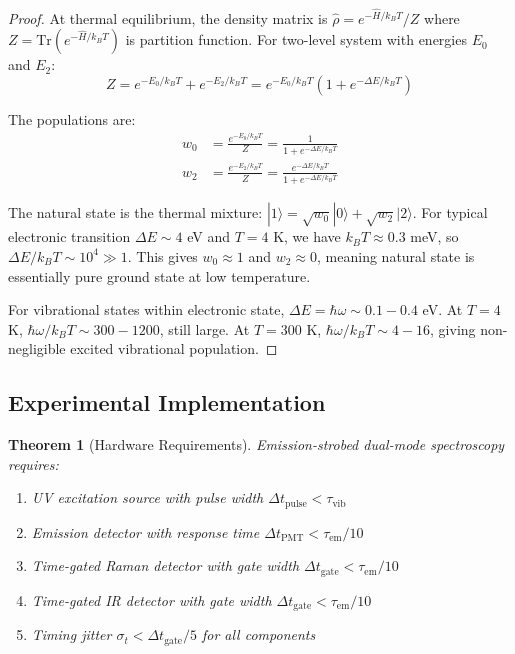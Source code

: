 \documentclass[twocolumn,10pt]{article}
\newtheorem{theorem}{Theorem}[section]
\begin{document}
\begin{proof}
At thermal equilibrium, the density matrix is $\hat{\rho} = e^{-\hat{H}/k_BT}/Z$ where $Z = \text{Tr}(e^{-\hat{H}/k_BT})$ is partition function. For two-level system with energies $E_0$ and $E_2$:
\begin{equation}
Z = e^{-E_0/k_BT} + e^{-E_2/k_BT} = e^{-E_0/k_BT}(1 + e^{-\Delta E/k_BT})
\end{equation}

The populations are:
\begin{align}
w_0 &= \frac{e^{-E_0/k_BT}}{Z} = \frac{1}{1 + e^{-\Delta E/k_BT}} \\
w_2 &= \frac{e^{-E_2/k_BT}}{Z} = \frac{e^{-\Delta E/k_BT}}{1 + e^{-\Delta E/k_BT}}
\end{align}

The natural state is the thermal mixture: $|1\rangle = \sqrt{w_0} |0\rangle + \sqrt{w_2} |2\rangle$. For typical electronic transition $\Delta E \sim 4$ eV and $T = 4$ K, we have $k_BT \approx 0.3$ meV, so $\Delta E/k_BT \sim 10^4 \gg 1$. This gives $w_0 \approx 1$ and $w_2 \approx 0$, meaning natural state is essentially pure ground state at low temperature.

For vibrational states within electronic state, $\Delta E = \hbar\omega \sim 0.1-0.4$ eV. At $T = 4$ K, $\hbar\omega/k_BT \sim 300-1200$, still large. At $T = 300$ K, $\hbar\omega/k_BT \sim 4-16$, giving non-negligible excited vibrational population.
\end{proof}

\subsection{Experimental Implementation}

\begin{theorem}[Hardware Requirements]
\label{thm:hardware_requirements}
Emission-strobed dual-mode spectroscopy requires:
\begin{enumerate}
\item UV excitation source with pulse width $\Delta t_{\text{pulse}} < \tau_{\text{vib}}$
\item Emission detector with response time $\Delta t_{\text{PMT}} < \tau_{\text{em}}/10$
\item Time-gated Raman detector with gate width $\Delta t_{\text{gate}} < \tau_{\text{em}}/10$
\item Time-gated IR detector with gate width $\Delta t_{\text{gate}} < \tau_{\text{em}}/10$
\item Timing jitter $\sigma_t < \Delta t_{\text{gate}}/5$ for all components
\end{enumerate}
\end{theorem}
\end{document}

